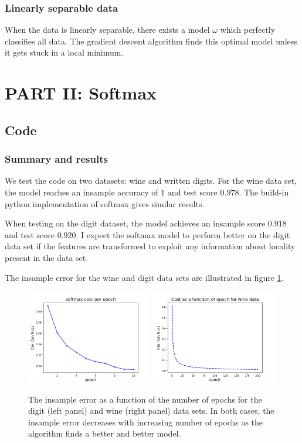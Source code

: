 \documentclass{article}
\begin{document}
	\subsubsection*{Linearly separable data}
	When the data is linearly separable, there exists a model $\omega$ which perfectly classifies all data.
	The gradient descent algorithm finds this optimal model unless it gets stuck in a local minimum.
	
\section*{PART II: Softmax}
\subsection*{Code}
\subsubsection*{Summary and results}
We test the code on two datasets: wine and written digits.
For the wine data set, the model reaches an insample accuracy of $1$ and test score $0.978$. The build-in python implementation of softmax gives similar results.

When testing on the digit dataset, the model achieves an insample score $0.918$ and test score $0.920$.
I expect the softmax model to perform better on the digit data set if the features are transformed to exploit any information about locality present in the data set.

The insample error for the wine and digit data sets are illustrated in figure \ref{fig:softmax}.
\begin{figure}
	\centering
	\includegraphics[width=0.49\textwidth]{softmax_cost_per_epoch}
	\includegraphics[width=0.49\textwidth]{softmax_wine_cost_per_epoch}
	\caption{The insample error as a function of the number of epochs for the digit (left panel) and wine (right panel) data sets. In both cases, the insample error decreases with increasing number of epochs as the algorithm finds a better and better model.}
	\label{fig:softmax}
\end{figure}
\end{document}
